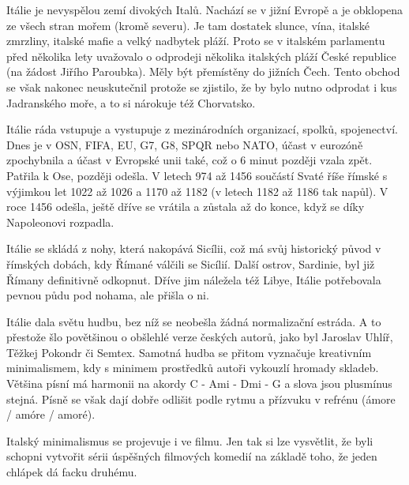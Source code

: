 \documentclass[10.5pt]{book}
\begin{document}
Itálie je nevyspělou zemí divokých Italů. Nachází se v jižní Evropě a je
obklopena ze všech stran mořem (kromě severu). Je tam dostatek slunce, vína,
italské zmrzliny, italské mafie a velký nadbytek pláží. Proto se v italském
parlamentu před několika lety uvažovalo o odprodeji několika italských pláží
České republice (na žádost Jiřího Paroubka). Měly být přemístěny do jižních
Čech. Tento obchod se však nakonec neuskutečnil protože se zjistilo, že by bylo
nutno odprodat i kus Jadranského moře, a to si nárokuje též Chorvatsko. 

Itálie ráda vstupuje a vystupuje z mezinárodních organizací, spolků,
spojenectví. Dnes je v OSN, FIFA, EU, G7, G8, SPQR nebo NATO, účast v eurozóně
zpochybnila a účast v Evropské unii také, což o 6 minut později vzala zpět.
Patřila k Ose, později odešla. V letech 974 až 1456 součástí Svaté říše římské
s výjimkou let 1022 až 1026 a 1170 až 1182 (v letech 1182 až 1186 tak napůl).
V roce 1456 odešla, ještě dříve se vrátila a zůstala až do konce, když se díky
Napoleonovi rozpadla. 

Itálie se skládá z nohy, která nakopává Sicílii, což má svůj historický původ
v římských dobách, kdy Římané válčili se Sicílií. Další ostrov, Sardinie, byl
již Římany definitivně odkopnut. Dříve jim náležela též Libye, Itálie
potřebovala pevnou půdu pod nohama, ale přišla o ni. 

Itálie dala světu hudbu, bez níž se neobešla žádná normalizační estráda. A to
přestože šlo povětšinou o obšlehlé verze českých autorů, jako byl Jaroslav
Uhlíř, Těžkej Pokondr či Semtex. Samotná hudba se přitom vyznačuje kreativním
minimalismem, kdy s minimem prostředků autoři vykouzlí hromady skladeb. Většina
písní má harmonii na akordy C - Ami - Dmi - G a slova jsou plusmínus stejná.
Písně se však dají dobře odlišit podle rytmu a přízvuku v refrénu
(ámore / amóre / amoré).

Italský minimalismus se projevuje i ve filmu. Jen tak si lze
vysvětlit, že byli schopni vytvořit sérii úspěšných filmových
komedií na základě toho, že jeden chlápek dá facku druhému. 

\newpage
\thispagestyle{empty}

\end{document}
